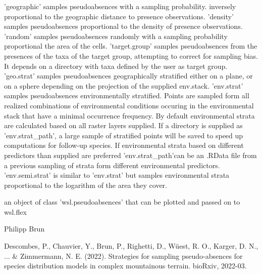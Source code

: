\documentclass[a4paper]{book}
\begin{document}
\begin{Details}\relax
'geographic' samples pseudoabsences with a sampling probability.
inversely proportional to the geographic distance to presence observations.
'density' samples pseudoabsences proportional to the density of presence
observations. 'random' samples pseudoabsences randomly with a sampling
probability proportional the area of the cells. 'target.group' samples
pseudoabsences from the presences of the taxa of the target group, attempting
to correct for sampling bias. It depends on a directory with taxa defined by the
user as target group. 'geo.strat' samples pseudoabsences geographically
stratified either on a plane, or on a sphere depending on the projection of
the supplied env.stack. 'env.strat' samples pseudoabsences environmentally
stratified. Points are sampled form all realized combinations of environmental
conditions occuring in the environmental stack that have a minimal occurrence
frequency. By default environmental strata are calculated based on all
raster layers supplied. If a directory is supplied as 'env.strat\_path', a
large sample of stratified points will be saved to speed up computations for
follow-up species. If environmental strata based on different predictors than
supplied are preferred 'env.strat\_path'can be an .RData file from a
previous sampling of strata form different environmental predictors. 'env.semi.strat'
is similar to 'env.strat' but samples environmental strata proportional to the
logarithm of the area they cover.
\end{Details}
%
\begin{Value}
an object of class 'wsl.pseudoabsences' that can be plotted and
passed on to wsl.flex
\end{Value}
%
\begin{Author}\relax
Philipp Brun
\end{Author}
%
\begin{References}\relax
Descombes, P., Chauvier, Y., Brun, P., Righetti, D., Wüest, R. O., Karger, D. N., ... \&
Zimmermann, N. E. (2022). Strategies for sampling pseudo-absences for species distribution
models in complex mountainous terrain. bioRxiv, 2022-03.
\end{References}
%
\end{document}
